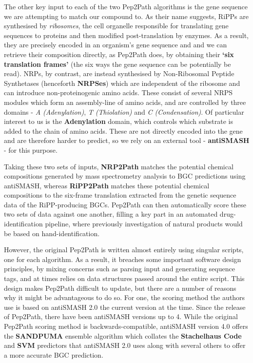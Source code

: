 \documentclass{l4proj}
\newcommand{\cit}[1]{\citep{#1}}
\begin{document}
The other key input to each of the two Pep2Path algorithms is the gene sequence we are attempting to match our compound to. As their name suggests, RiPPs are synthesised by \textit{ribosomes}, the cell organelle responsible for translating gene sequences to proteins and then modified post-translation by enzymes. As a result, they are precisely encoded in an organism's gene sequence and and we can retrieve their composition directly, as Pep2Path does, by obtaining their \textbf{`six translation frames'} (the six ways the gene sequence can be potentially be read). NRPs, by contrast, are instead synthesised by Non-Ribosomal Peptide Synthetases (henceforth \textbf{NRPSes}) which are independent of the ribosome and can introduce non-proteinogenic amino acids. These consist of several NRPS modules which form an assembly-line of amino acids, and are controlled by three domains - \textit{A (Adenylation)}, \textit{T (Thiolation)} and \textit{C (Condensation)}. Of particular interest to us is the \textbf{Adenylation} domain, which controls which substrate is added to the chain of amino acids. These are not directly encoded into the gene and are therefore harder to predict, so we rely on an external tool - \textbf{antiSMASH} \cit{as4} - for this purpose.

Taking these two sets of inputs, \textbf{NRP2Path} matches the potential chemical compositions generated by mass spectrometry analysis to BGC predictions using antiSMASH, whereas \textbf{RiPP2Path} matches these potential chemical compositions to the six-frame translation extracted from the genetic sequence data of the RiPP-producing BGCs. Pep2Path can then automatically score these two sets of data against one another, filling a key part in an automated drug-identification pipeline, where previously investigation of natural products would be based on hand-identification.

However, the original Pep2Path is written almost entirely using singular scripts, one for each algorithm. As a result, it breaches some important software design principles, by mixing concerns such as parsing input and generating sequence tags, and at times relies on data structures passed around the entire script. This design makes Pep2Path difficult to update, but there are a number of reasons why it might be advantageous to do so. For one, the scoring method the authors use is based on antiSMASH 2.0 \cit{as2} the current version at the time. Since the release of Pep2Path, there have been antiSMASH versions up to 4. \cit{as4} While the original Pep2Path scoring method is backwards-compatible, antiSMASH version 4.0 offers the \textbf{SANDPUMA} ensemble algorithm \cit{sandpuma} which collates the \textbf{Stachelhaus Code} and \textbf{SVM} predictors that antiSMASH 2.0 uses along with several others to offer a more accurate BGC prediction.
\end{document}
